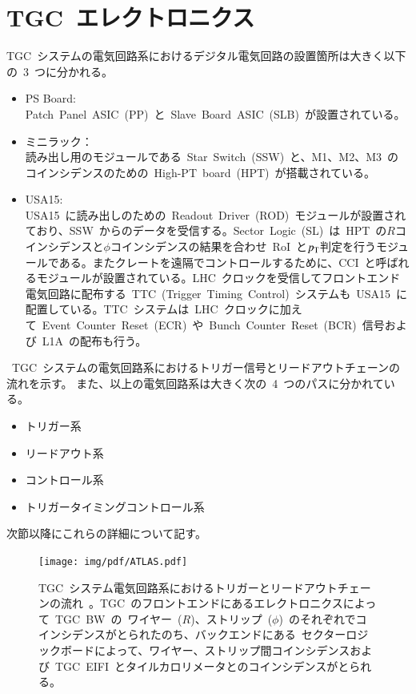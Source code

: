 \section{TGC~エレクトロニクス}
TGC~システムの電気回路系におけるデジタル電気回路の設置箇所は大きく以下の~3~つに分かれる。
\begin{itemize}
    \item PS Board: \\
    Patch~Panel~ASIC~(PP)~と~Slave~Board~ASIC~(SLB)~が設置されている。
    \item ミニラック：\\
    読み出し用のモジュールである~Star~Switch~(SSW)~と、M1、M2、M3~のコインシデンスのための~High-PT~board~(HPT)~が搭載されている。
    \item USA15: \\
    USA15~に読み出しのための~Readout~Driver~(ROD)~モジュールが設置されており、SSW~からのデータを受信する。Sector~Logic~(SL)~は~HPT~の$R$コインシデンスと$\phi$コインシデンスの結果を合わせ~RoI~と$p_{\rm{T}}$判定を行うモジュールである。またクレートを遠隔でコントロールするために、CCI~と呼ばれるモジュールが設置されている。LHC~クロックを受信してフロントエンド電気回路に配布する~TTC~(Trigger~Timing~Control)~システムも~USA15~に配置している。TTC~システムは~LHC~クロックに加えて~Event~Counter~Reset~(ECR)~や~Bunch~Counter~Reset~(BCR)~信号および~L1A~の配布も行う。
\end{itemize}
~TGC~システムの電気回路系におけるトリガー信号とリードアウトチェーンの流れを示す。
また、以上の電気回路系は大きく次の~4~つのパスに分かれている。
\begin{itemize}
    \item トリガー系
    \item リードアウト系
    \item コントロール系
    \item トリガータイミングコントロール系
\end{itemize}
次節以降にこれらの詳細について記す。

\begin{figure}[tbp]
        \centering   
        \texttt{[image: img/pdf/ATLAS.pdf]}
        \caption[TGC システム電気回路系におけるトリガーとリードアウトチェーンの流れ]{TGC~システム電気回路系におけるトリガーとリードアウトチェーンの流れ~\cite{TR:01}。TGC~のフロントエンドにあるエレクトロニクスによって~TGC~BW~の~ワイヤー~($R$)、ストリップ~($\phi$)~のそれぞれでコインシデンスがとられたのち、バックエンドにある~セクターロジックボードによって、ワイヤー、ストリップ間コインシデンスおよび~TGC~EIFI~とタイルカロリメータとのコインシデンスがとられる。}
        \label{fig:tgcelec}
\end{figure}

